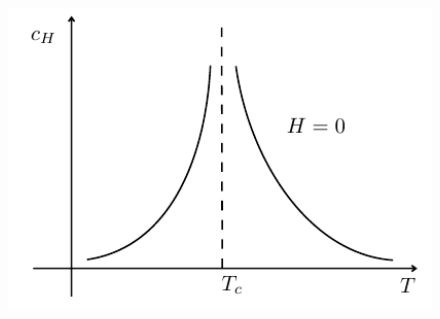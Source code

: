 \documentclass[../main/main.tex]{subfiles}
\begin{document}
\begin{figure}[h!]
\begin{minipage}[c]{0.5\linewidth}
{\includegraphics[width=1\textwidth]{../lessons/3_image/12.pdf}
    \label{fig:3_4_3} }
\end{minipage}
\begin{minipage}[]{0.5\linewidth}
\centering
{}
\end{minipage}
\caption{\label{fig:}}
\end{figure}
\end{document}
